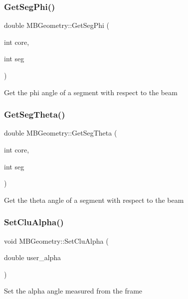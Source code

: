 \subsubsection{\texorpdfstring{Get\+Seg\+Phi()}{GetSegPhi()}}
{\footnotesize\ttfamily double M\+B\+Geometry\+::\+Get\+Seg\+Phi (\begin{DoxyParamCaption}\item[{int}]{core,  }\item[{int}]{seg }\end{DoxyParamCaption})}

Get the phi angle of a segment with respect to the beam \mbox{\label{class_m_b_geometry_a49cdf742a2902fc85f0b24dfffa554a8}} 
\subsubsection{\texorpdfstring{Get\+Seg\+Theta()}{GetSegTheta()}}
{\footnotesize\ttfamily double M\+B\+Geometry\+::\+Get\+Seg\+Theta (\begin{DoxyParamCaption}\item[{int}]{core,  }\item[{int}]{seg }\end{DoxyParamCaption})}

Get the theta angle of a segment with respect to the beam \mbox{\label{class_m_b_geometry_a0d4868b0360a6e5534918a9813540015}} 
\subsubsection{\texorpdfstring{Set\+Clu\+Alpha()}{SetCluAlpha()}}
{\footnotesize\ttfamily void M\+B\+Geometry\+::\+Set\+Clu\+Alpha (\begin{DoxyParamCaption}\item[{double}]{user\+\_\+alpha }\end{DoxyParamCaption})}

Set the alpha angle measured from the frame \mbox{\label{class_m_b_geometry_a74142f84cf6317d52ae39c0e0ff8a87e}} 
